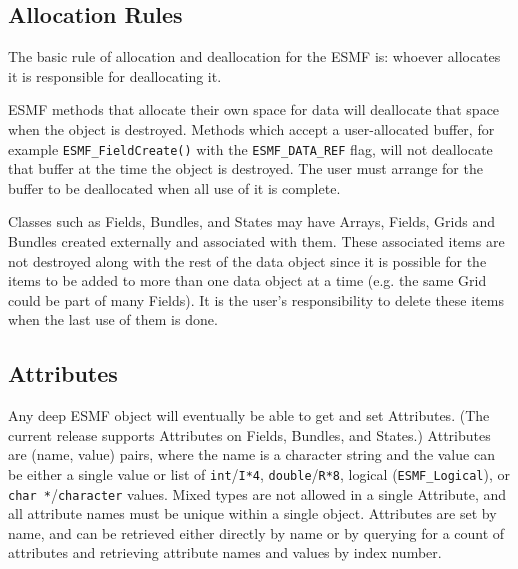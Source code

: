 \subsection{Allocation Rules}

The basic rule of allocation and deallocation for the ESMF is:
whoever allocates it is responsible for deallocating it.

ESMF methods that allocate their own space for data will
deallocate that space when the object is destroyed. 
Methods which accept a user-allocated buffer, for example
{\tt ESMF\_FieldCreate()} with the {\tt ESMF\_DATA\_REF} flag,
will not deallocate that buffer at the time the object is
destroyed.  The user must arrange for the buffer to be deallocated
when all use of it is complete.

Classes such as Fields, Bundles, and States may have Arrays, 
Fields, Grids and Bundles created externally and associated with
them.  These associated items are not destroyed along with the rest  
of the data object since it is possible for the items to be added 
to more than one data object at a time (e.g. the same Grid could 
be part of many Fields).  It is the user's responsibility to delete 
these items when the last use of them is done.

\subsection{Attributes}

Any deep ESMF object will eventually be able to get and set
Attributes.  (The current release supports Attributes on Fields,
Bundles, and States.)  Attributes are (name, value) pairs, where
the name is a character string and the value can be either a single
value or list of {\tt int}/{\tt I*4}, {\tt double}/{\tt R*8},
logical ({\tt ESMF\_Logical}), or {\tt char *}/{\tt character} values.
Mixed types are not allowed in a single Attribute, and all attribute
names must be unique within a single object.    Attributes are set
by name, and can be retrieved either directly by name or by querying
for a count of attributes and retrieving attribute names and values
by index number.









